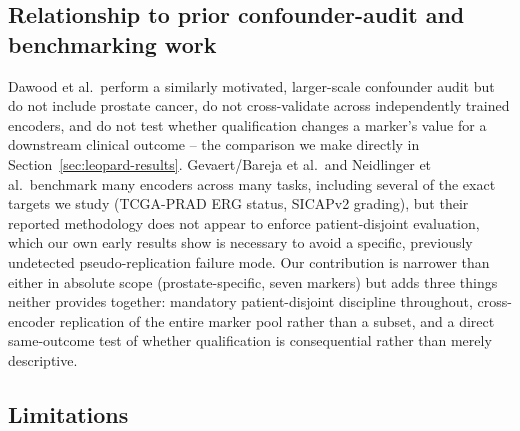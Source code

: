 \subsection{Relationship to prior confounder-audit and benchmarking work}

Dawood et al.\ perform a similarly motivated, larger-scale confounder audit but do not include
prostate cancer, do not cross-validate across independently trained encoders, and do not test
whether qualification changes a marker's value for a downstream clinical outcome -- the
comparison we make directly in Section~\ref{sec:leopard-results}. Gevaert/Bareja et al.\ and
Neidlinger et al.\ benchmark many encoders across many tasks, including several of the exact
targets we study (TCGA-PRAD ERG status, SICAPv2 grading), but their reported methodology does
not appear to enforce patient-disjoint evaluation, which our own early results show is
necessary to avoid a specific, previously undetected pseudo-replication failure mode. Our
contribution is narrower than either in absolute scope (prostate-specific, seven markers) but
adds three things neither provides together: mandatory patient-disjoint discipline throughout,
cross-encoder replication of the entire marker pool rather than a subset, and a direct
same-outcome test of whether qualification is consequential rather than merely descriptive.

\subsection{Limitations}

